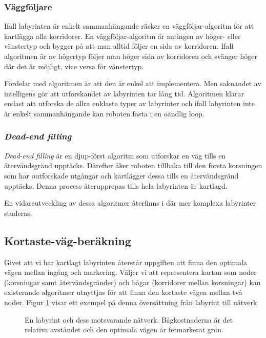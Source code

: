 \documentclass[11pt]{article}
\begin{document}
\begin{flushleft}
\subsubsection{Väggföljare}
Ifall labyrinten är enkelt sammanhängande räcker en väggföljar-algoritm för att kartlägga alla korridorer. En väggföljar-algoritm är antingen av höger- eller vänstertyp och bygger på att man alltid följer en sida av korridoren. Ifall algoritmen är av högertyp följer man höger sida av korridoren och svänger höger där det är möjligt, vice versa för vänstertyp.

Fördelar med algoritmen är att den är enkel att implementera. Men saknandet av intelligens gör att utforskandet av labyrinten tar lång tid. Algoritmen klarar endast att utforska de allra enklaste typer av labyrinter och ifall labyrinten inte är enkelt sammanhängande kan roboten fasta i en oändlig loop.

\subsubsection{\emph{Dead-end filling}}
\emph{Dead-end filling} är en djup-först algoritm som utforskar en väg tills en återvändsgränd upptäcks. Därefter åker roboten tillbaka till den första korsningen som har outforskade utgångar och kartlägger dessa tills en återvändsgränd upptäcks. Denna process återupprepas tills hela labyrinten är kartlagd.

En vidareutveckling av dessa algoritmer återfinns i \cite{flood} där mer komplexa labyrinter studeras.

\subsection{Kortaste-väg-beräkning}
\label{optimalvag}
Givet att vi har kartlagt labyrinten återstår uppgiften att finna den optimala vägen mellan ingång och markering. Väljer vi att representera kartan som noder (korsningar samt återvändsgränder) och bågar (korridorer mellan korsningar) kan existerande algoritmer utnyttjas för att finna den kortaste vägen mellan två noder. Figur \ref{labToGraph} visar ett exempel på denna översättning från labyrint till nätverk. 

\begin{figure}[htbp]
\centering
\noindent\resizebox{.6\linewidth}{!}{
	}
	\caption{En labyrint och dess motsvarande nätverk. Bågkostnaderna är det relativa avståndet och den optimala vägen är fetmarkerat grön.\label{labToGraph}}	
\end{figure}


\end{flushleft}
\end{document}

